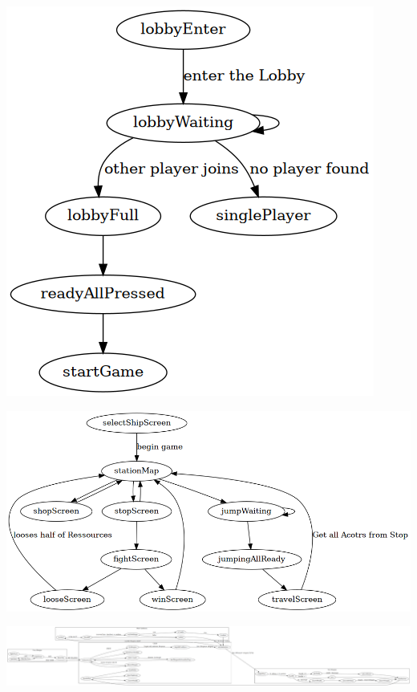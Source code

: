 \documentclass[11pt]{article}
\begin{document}
\begin{center}
\includegraphics[width=.9\linewidth]{Multiplayer.png}
\end{center}



\begin{center}
\includegraphics[width=.9\linewidth]{jumping.png}
\end{center}



\begin{center}
\includegraphics[width=.9\linewidth]{kampf.png}
\end{center}
\end{document}
